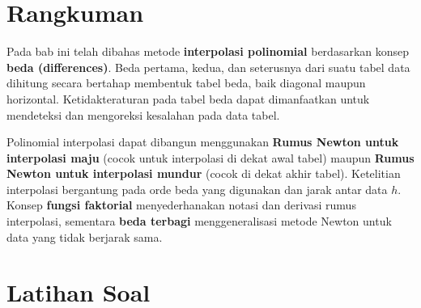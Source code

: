 \section*{Rangkuman}

Pada bab ini telah dibahas metode \textbf{interpolasi polinomial} berdasarkan konsep \textbf{beda (differences)}. Beda pertama, kedua, dan seterusnya dari suatu tabel data dihitung secara bertahap membentuk tabel beda, baik diagonal maupun horizontal. Ketidakteraturan pada tabel beda dapat dimanfaatkan untuk mendeteksi dan mengoreksi kesalahan pada data tabel.

Polinomial interpolasi dapat dibangun menggunakan \textbf{Rumus Newton untuk interpolasi maju} (cocok untuk interpolasi di dekat awal tabel) maupun \textbf{Rumus Newton untuk interpolasi mundur} (cocok di dekat akhir tabel). Ketelitian interpolasi bergantung pada orde beda yang digunakan dan jarak antar data $h$. Konsep \textbf{fungsi faktorial} menyederhanakan notasi dan derivasi rumus interpolasi, sementara \textbf{beda terbagi} menggeneralisasi metode Newton untuk data yang tidak berjarak sama.

\section*{Latihan Soal}

